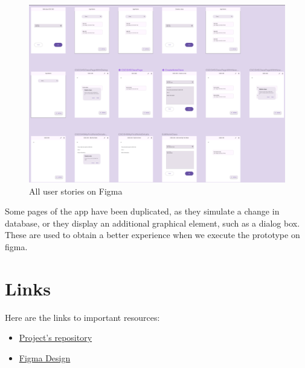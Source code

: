 \documentclass[]{article}
\begin{document}
	\begin{figure}[!htb]
		\centering
		\includegraphics[scale=0.3]{figma_user_stories_finish}
		\caption{All user stories on Figma}
	\end{figure}
	
	Some pages of the app have been duplicated, as they simulate a change in database, or they display an additional graphical element, such as a dialog box.
	These are used to obtain a better experience when we execute the prototype on figma.
	
	\pagebreak
	
	\section{Links}
	
	Here are the links to important resources:
	
	\begin{itemize}
		\item \href{https://github.com/Logan-Developer/ui-lahumbert/tree/main/FinalProject}{Project's repository} 
		
		\item \href{https://www.figma.com/file/ZOlxVGHb9fLdk5uUODqMU9/CSCI-337---Notes-Taking-App?type=design&node-id=54810%3A34721&mode=design&t=fS6KJvRgsvtgz9cf-1}{Figma Design}
	\end{itemize}
	
	\label{LastPage}
\end{document}
